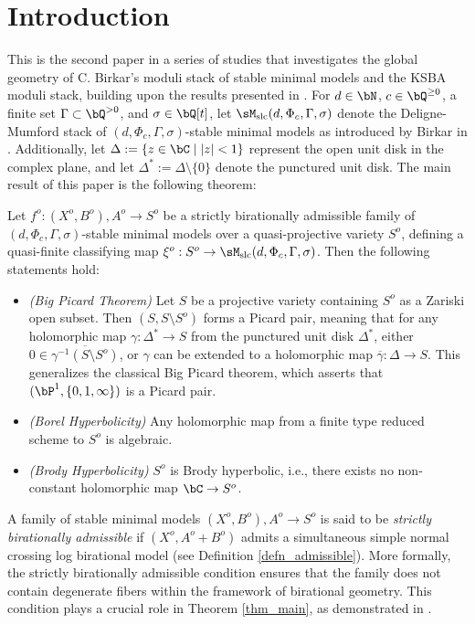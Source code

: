 \documentclass[11pt,letterpaper]{amsart}
\numberwithin{equation}{section}
\begin{document}
	\section{Introduction}
	This is the second paper in a series of studies that investigates the global geometry of C. Birkar's moduli stack of stable minimal models and the KSBA moduli stack, building upon the results presented in \cite{stjc2025}. For $d \in \bN$, $c \in \bQ^{\geq 0}$, a finite set $\Gamma \subset \bQ^{> 0}$, and $\sigma \in \bQ[t]$, let $\sM_{\rm slc}(d,\Phi_c,\Gamma,\sigma)$ denote the Deligne-Mumford stack of $(d,\Phi_c,\Gamma,\sigma)$-stable minimal models as introduced by Birkar in \cite{Birkar2022}. Additionally, let $\Delta := \{z \in \bC \mid |z| < 1\}$ represent the open unit disk in the complex plane, and let $\Delta^\ast := \Delta \setminus \{0\}$ denote the punctured unit disk.
	The main result of this paper is the following theorem:  
	\begin{thm}\label{thm_main}  
		Let $f^o:(X^o,B^o),A^o \to S^o$ be a strictly birationally admissible family of $(d,\Phi_c,\Gamma,\sigma)$-stable minimal models over a quasi-projective variety $S^o$, defining a quasi-finite classifying map $\xi^o:S^o \to \sM_{\rm slc}(d,\Phi_c,\Gamma,\sigma)$. Then the following statements hold:  
		\begin{itemize}  
			\item \emph{(Big Picard Theorem)} Let $S$ be a projective variety containing $S^o$ as a Zariski open subset. Then $(S, S \setminus S^o)$ forms a Picard pair, meaning that for any holomorphic map $\gamma: \Delta^\ast \to S$ from the punctured unit disk $\Delta^\ast$, either $0 \in \overline{\gamma^{-1}(S \setminus S^o)}$, or $\gamma$ can be extended to a holomorphic map $\overline{\gamma}: \Delta \to S$. This generalizes the classical Big Picard theorem, which asserts that $(\bP^1, \{0, 1, \infty\})$ is a Picard pair.  
			\item \emph{(Borel Hyperbolicity)} Any holomorphic map from a finite type reduced scheme to $S^o$ is algebraic.  
			\item \emph{(Brody Hyperbolicity)} $S^o$ is Brody hyperbolic, i.e., there exists no non-constant holomorphic map $\bC \to S^o$.  
		\end{itemize}  
	\end{thm}  
	A family of stable minimal models $(X^o, B^o), A^o \to S^o$ is said to be \emph{strictly birationally admissible} if $(X^o, A^o + B^o)$ admits a simultaneous simple normal crossing log birational model (see Definition \ref{defn_admissible}). More formally, the strictly birationally admissible condition ensures that the family does not contain degenerate fibers within the framework of birational geometry. This condition plays a crucial role in Theorem \ref{thm_main}, as demonstrated in \cite{stjc2025}.
	
\end{document}
